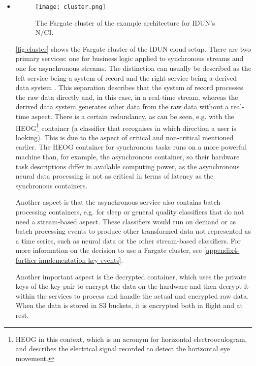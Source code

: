 \begin{itemize}

  \item \begin{figure}[!ht]
          \centering
          \texttt{[image: cluster.png]}
          \caption{The Fargate cluster of the example architecture for IDUN's N/CI.}
          \label{fig:cluster}
        \end{figure}

        \autoref{fig:cluster} shows the Fargate cluster of the IDUN cloud setup. There are two primary services: one for business logic applied to synchronous streams and one for asynchronous streams. The distinction can usually be described as the left service being a system of record and the right service being a derived data system \citep{kleppmann_designing_2017}. This separation describes that the system of record processes the raw data directly and, in this case, in a real-time stream, whereas the derived data system generates other data from the raw data without a real-time aspect. There is a certain redundancy, as can be seen, e.g. with the HEOG\footnote{HEOG in this context, which is an acronym for horizontal electrooculogram, and describes the electrical signal recorded to detect the horizontal eye movement.} container (a classifier that recognises in which direction a user is looking). This is due to the aspect of critical and non-critical mentioned earlier. The HEOG container for synchronous tasks runs on a more powerful machine than, for example, the asynchronous container, so their hardware task descriptions differ in available computing power, as the asynchronous neural data processing is not as critical in terms of latency as the synchronous containers.

        Another aspect is that the asynchronous service also contains batch processing containers, e.g. for sleep or general quality classifiers that do not need a stream-based aspect. These classifiers would run on demand or as batch processing events to produce other transformed data not represented as a time series, such as neural data or the other stream-based classifiers. For more information on the decision to use a Fargate cluster, see \autoref{appendix4-further-implementation-key-events}.

        Another important aspect is the decrypted container, which uses the private keys of the key pair to encrypt the data on the hardware and then decrypt it within the services to process and handle the actual and encrypted raw data. When the data is stored in S3 buckets, it is encrypted both in flight and at rest.


\end{itemize}
